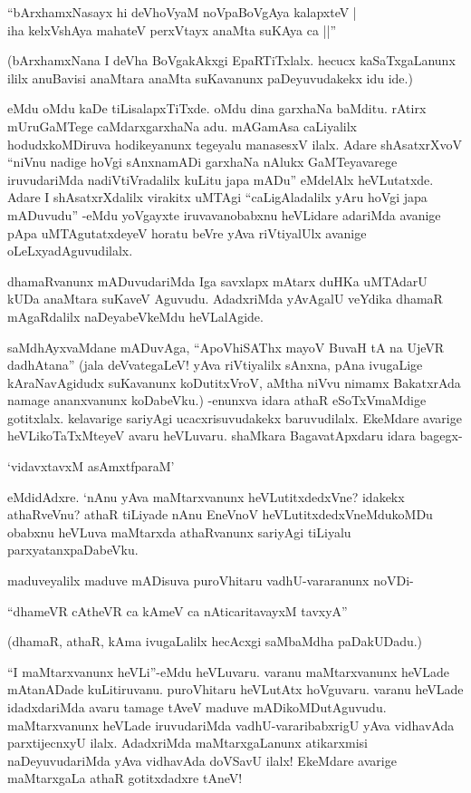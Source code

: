 \begin{shloka}
``bArxhamxNasayx hi deVhoV\s yaM noVpaBoVgAya kalapxteV |\\
iha kelxVshAya mahateV perxVtayx anaMta suKAya ca ||''
\end{shloka}

(bArxhamxNana I deVha BoVgakAkxgi EpaRTiTxlalx. hecucx kaSaTxgaLanunx ililx anuBavisi anaMtara anaMta suKavanunx paDeyuvudakekx idu ide.)

eMdu oMdu kaDe tiLisalapxTiTxde. oMdu dina garxhaNa baMditu. rAtirx mUruGaMTege caMdarxgarxhaNa adu. mAGamAsa caLiyalilx hodudxkoMDiruva hodikeyanunx tegeyalu manasesxV ilalx. Adare shAsatxrXvoV ``niVnu nadige hoVgi sAnxnamADi garxhaNa nAlukx GaMTeyavarege iruvudariMda nadiVtiVradalilx kuLitu japa mADu'' eMdelAlx heVLutatxde. Adare I shAsatxrXdalilx virakitx uMTAgi ``caLigAladalilx yAru hoVgi japa mADuvudu'' -eMdu yoVgayxte iruvavanobabxnu heVLidare adariMda avanige pApa uMTAgutatxdeyeV horatu beVre yAva riVtiyalUlx avanige oLeLxyadAguvudilalx.

dhamaRvanunx mADuvudariMda Iga savxlapx mAtarx duHKa uMTAdarU kUDa anaMtara suKaveV Aguvudu. AdadxriMda yAvAgalU veYdika dhamaR mAgaRdalilx naDeyabeVkeMdu heVLalAgide.

saMdhAyxvaMdane mADuvAga, ``ApoVhiSAThx mayoV BuvaH tA na UjeVR dadhAtana'' (jala deVvategaLeV! yAva riVtiyalilx sAnxna, pAna ivugaLige kAraNavAgidudx suKavanunx koDutitxVroV, aMtha niVvu nimamx BakatxrAda namage ananxvanunx koDabeVku.) -enunxva idara athaR eSoTxVmaMdige gotitxlalx. kelavarige sariyAgi ucacxrisuvudakekx baruvudilalx. EkeMdare avarige heVLikoTaTxMteyeV avaru heVLuvaru. shaMkara BagavatApxdaru idara bagegx-

\begin{shloka}
`vidavxtavxM asAmxtfparaM'
\end{shloka}

\noindent eMdidAdxre. `nAnu yAva maMtarxvanunx heVLutitxdedxVne? idakekx athaRveVnu? athaR tiLiyade nAnu EneVnoV heVLutitxdedxVneMdukoMDu obabxnu heVLuva maMtarxda athaRvanunx sariyAgi tiLiyalu parxyatanxpaDabeVku.

maduveyalilx maduve mADisuva puroVhitaru vadhU-vararanunx noVDi-

\begin{shloka}
``dhameVR cAtheVR ca kAmeV ca nAticaritavayxM tavxyA''
\end{shloka}

(dhamaR, athaR, kAma ivugaLalilx hecAcxgi saMbaMdha paDakUDadu.)

``I maMtarxvanunx heVLi''-eMdu heVLuvaru. varanu maMtarxvanunx heVLade mAtanADade kuLitiruvanu. puroVhitaru heVLutAtx hoVguvaru. varanu heVLade idadxdariMda avaru tamage tAveV maduve mADikoMDutAguvudu. maMtarxvanunx heVLade iruvudariMda vadhU-vararibabxrigU yAva vidhavAda parxtijecnxyU ilalx. AdadxriMda maMtarxgaLanunx atikarxmisi naDeyuvudariMda yAva vidhavAda doVSavU ilalx! EkeMdare avarige maMtarxgaLa athaR gotitxdadxre tAneV!

